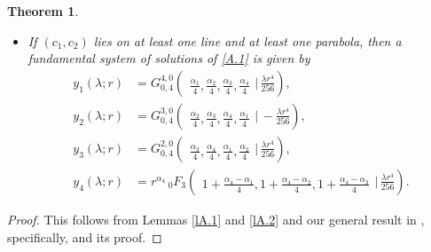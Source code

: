 \documentclass[reqno,11pt,centertags]{amsart}
\newcommand{\<}{\langle}
\renewcommand{\>}{\rangle}
\numberwithin{equation}{section}
\newtheorem{theorem}{Theorem}[section]
\theoremstyle{definition}
\begin{document}
\begin{theorem}
\begin{itemize}
\begin{align}
\begin{array}{c}
\end{array} \bigg\vert\,   \frac{\lambda r^4}{256} \right),\\
y_3(\lambda;r)&=r^{\alpha_3} \,_{0} F_3\left(\!\begin{array}{c}\\
{ 1+\frac{\alpha_3-\alpha_1}{4}, 1+\frac{\alpha_3-\alpha_2}{4}, 1+\frac{\alpha_3-\alpha_4}{4}}
\end{array} \bigg\vert\,  \frac{\lambda r^4}{256} \right),\\
y_4(\lambda;r)&=r^{\alpha_4} \,_{0} F_3\left(\!\begin{array}{c}\\
{ 1+\frac{\alpha_4-\alpha_1}{4}, 1+\frac{\alpha_4-\alpha_2}{4}, 1+\frac{\alpha_4-\alpha_3}{4}}
\end{array} \bigg\vert\,  \frac{\lambda r^4}{256} \right).
\end{align}
\item[(d)] If $(c_1,c_2)$ lies on at least one line and at least one parabola, then a fundamental system of solutions of \eqref{A.1} is given by 
\begin{align}
y_1(\lambda;r)&=G_{0,4}^{4,0}\left(\!\begin{array}{c}\\
{\frac{\alpha_1}{4},\frac{\alpha_2}{4}, \frac{\alpha_3}{4},\frac{\alpha_4}{4}}
\end{array} \bigg\vert\,   \frac{\lambda r^4}{256} \right),\\
y_2(\lambda;r)&=G_{0,4}^{3,0}\left(\!\begin{array}{c}\\
{\frac{\alpha_2}{4},\frac{\alpha_3}{4}, \frac{\alpha_4}{4},\frac{\alpha_1}{4}}
\end{array} \bigg\vert\,  - \frac{\lambda r^4}{256} \right),\\
y_3(\lambda;r)&=G_{0,4}^{2,0}\left(\!\begin{array}{c}\\
{\frac{\alpha_3}{4},\frac{\alpha_4}{4}, \frac{\alpha_1}{4},\frac{\alpha_2}{4}}
\end{array} \bigg\vert\,   \frac{\lambda r^4}{256} \right),\\
y_4(\lambda;r)&=r^{\alpha_4} \,_{0} F_3\left(\!\begin{array}{c}\\
{ 1+\frac{\alpha_4-\alpha_1}{4}, 1+\frac{\alpha_4-\alpha_2}{4}, 1+\frac{\alpha_4-\alpha_3}{4}}
\end{array} \bigg\vert\,  \frac{\lambda r^4}{256} \right).
\end{align}
\end{itemize}
\end{theorem}
\begin{proof}
This follows from Lemmas \ref{lA.1} and \ref{lA.2} and our general result in \cite{GH23}, specifically, \cite[Theorem~4.3]{GH23} and its proof. 
\end{proof}
\end{document}
